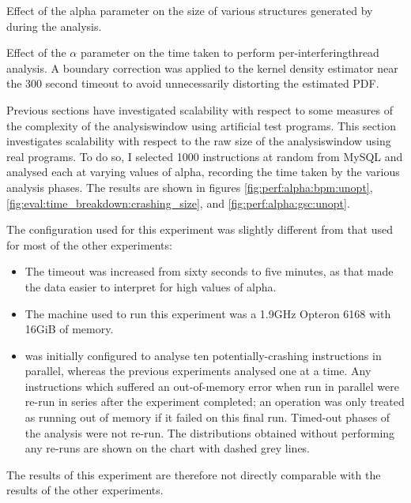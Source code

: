 \begin{sanefig}
  \caption{Effect of the \gls{alpha} parameter on the size of various
    structures generated by {\technique} during the analysis.}
  \label{fig:eval:time_breakdown:crashing_size}
\end{sanefig}

\begin{sanefig}
  \caption{Effect of the $\alpha$ parameter on the time taken to
    perform per-\gls{interferingthread} analysis. A boundary
    correction was applied to the kernel density estimator near the
    300 second timeout to avoid unnecessarily distorting the estimated
    PDF.}
  \label{fig:perf:alpha:gsc:unopt}
\end{sanefig}

Previous sections have investigated scalability with respect to some
measures of the complexity of the \gls{analysiswindow} using
artificial test programs.  This section investigates scalability with
respect to the raw size of the \gls{analysiswindow} using real
programs.  To do so, I selected 1000 instructions at random from MySQL
and analysed each at varying values of \gls{alpha}, recording the time
taken by the various analysis phases.  The results are shown in
figures \ref{fig:perf:alpha:bpm:unopt},
\ref{fig:eval:time_breakdown:crashing_size}, and
\ref{fig:perf:alpha:gsc:unopt}.    


The configuration used for this experiment was slightly different from
that used for most of the other experiments:
\begin{itemize}
\item The timeout was increased from sixty seconds to five minutes, as
  that made the data easier to interpret for high values of
  \gls{alpha}.
\item The machine used to run this experiment was a 1.9GHz Opteron
  6168 with 16GiB of memory.
\item {\Implementation} was initially configured to analyse ten
  potentially-crashing instructions in parallel, whereas the previous
  experiments analysed one at a time.  Any instructions which suffered
  an out-of-memory error when run in parallel were re-run in series
  after the experiment completed; an operation was only treated as
  running out of memory if it failed on this final run.  Timed-out
  phases of the analysis were not re-run.  The distributions obtained
  without performing any re-runs are shown on the chart with dashed
  grey lines.
\end{itemize}
The results of this experiment are therefore not directly comparable
with the results of the other experiments.

